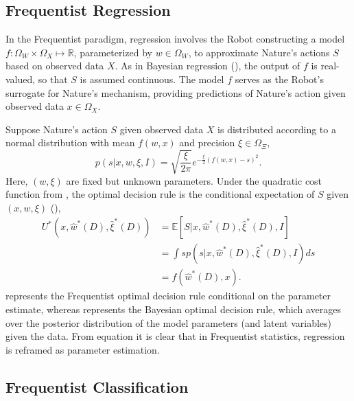 \subsection{Frequentist Regression}
\label{chp:frequentist_regression}
In the Frequentist paradigm, regression involves the Robot constructing a model $f: \Omega_W \times \Omega_X \mapsto \mathbb{R}$, parameterized by $w \in \Omega_W$, to approximate Nature's actions $S$ based on observed data $X$. As in Bayesian regression (), the output of $f$ is real-valued, so that $S$ is assumed continuous. The model $f$ serves as the Robot's surrogate for Nature's mechanism, providing predictions of Nature's action given observed data $x \in \Omega_X$. \newline

Suppose Nature's action $S$ given observed data $X$ is distributed according to a normal distribution with mean $f(w,x)$ and precision $\xi \in \Omega_{\Xi}$,
\begin{equation}
	p(s | x, w, \xi, I) 
	= \sqrt{\frac{\xi}{2\pi}} e^{-\frac{\xi}{2}(f(w,x)-s)^2}.
	\label{freq:dist}
\end{equation}
Here, $(w,\xi)$ are fixed but unknown parameters. Under the quadratic cost function from , the optimal decision rule is the conditional expectation of $S$ given $(x,w,\xi)$ (),
\begin{equation}
	\begin{split}
		U^*(x,\hat{w}^*(D),\hat{\xi}^*(D)) &= \mathbb{E}[S | x, \hat{w}^*(D), \hat{\xi}^*(D), I]\\
		&= \int s p(s | x, \hat{w}^*(D), \hat{\xi}^*(D), I) ds\\
		& = f(\hat{w}^*(D),x).
	\end{split}
	\label{freq:decision}
\end{equation}
 represents the Frequentist optimal decision rule conditional on the parameter estimate, whereas  represents the Bayesian optimal decision rule, which averages over the posterior distribution of the model parameters (and latent variables) given the data. From equation  it is clear that in Frequentist statistics, regression is reframed as parameter estimation.


\subsection{Frequentist Classification}
\label{chp:frequentist_classification}

